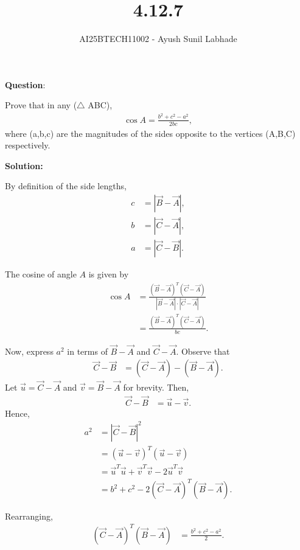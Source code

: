 \documentclass[journal,12pt,onecolumn]{IEEEtran}
\begin{document}
\title{4.12.7}
\author{AI25BTECH11002 - Ayush Sunil Labhade}
{\let\newpage\relax\maketitle}


\textbf{Question}:

Prove that in any ($\triangle$ ABC),
\begin{align}
\cos A = \frac{b^{2}+c^{2}-a^{2}}{2bc},
\end{align}
where (a,b,c) are the magnitudes of the sides opposite to the vertices (A,B,C) respectively.

\textbf{Solution:}

By definition of the side lengths,
\begin{align}
c &= |\vec{B} - \vec{A}|, \\
b &= |\vec{C} - \vec{A}|, \\
a &= |\vec{C} - \vec{B}|.
\end{align}

The cosine of angle \(A\) is given by
\begin{align}
\cos A &= \frac{(\vec{B} - \vec{A})^T (\vec{C} - \vec{A})}{|\vec{B} - \vec{A}| \cdot |\vec{C} - \vec{A}|} \\
       &= \frac{(\vec{B} - \vec{A})^T (\vec{C} - \vec{A})}{bc}.
\end{align}

Now, express \(a^2\) in terms of \(\vec{B} - \vec{A}\) and \(\vec{C} - \vec{A}\). Observe that
\begin{align}
\vec{C} - \vec{B} &= (\vec{C} - \vec{A}) - (\vec{B} - \vec{A}).
\end{align}
Let \(\vec{u} = \vec{C} - \vec{A}\) and \(\vec{v} = \vec{B} - \vec{A}\) for brevity. Then,
\begin{align}
\vec{C} - \vec{B} &= \vec{u} - \vec{v}.
\end{align}
Hence,
\begin{align}
a^2 &= |\vec{C} - \vec{B}|^2 \\
    &= (\vec{u} - \vec{v})^T (\vec{u} - \vec{v}) \\
    &= \vec{u}^T \vec{u} + \vec{v}^T \vec{v} - 2 \vec{u}^T \vec{v} \\
    &= b^2 + c^2 - 2 (\vec{C} - \vec{A})^T (\vec{B} - \vec{A}).
\end{align}

Rearranging,
\begin{align}
(\vec{C} - \vec{A})^T (\vec{B} - \vec{A}) &= \frac{b^2 + c^2 - a^2}{2}.
\end{align}
\end{document}
